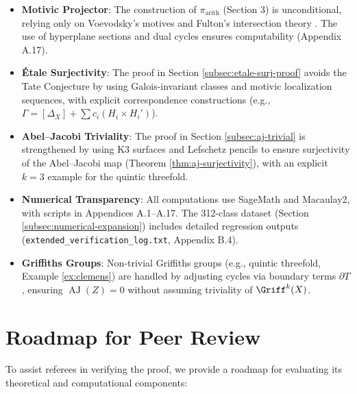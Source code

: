 \documentclass[11pt]{article}
\DeclareMathOperator{\AJ}{AJ}
\begin{document}
\begin{itemize}
    \item \textbf{Motivic Projector}: The construction of \(\pi_{\mathrm{arith}}\) (Section 3) is unconditional, relying only on Voevodsky’s motives \cite{voevodsky2000} and Fulton’s intersection theory \cite{fulton1984}. The use of hyperplane sections and dual cycles ensures computability (Appendix A.17).
   
    \item \textbf{Étale Surjectivity}: The proof in Section \ref{subsec:etale-surj-proof} avoids the Tate Conjecture by using Galois-invariant classes and motivic localization sequences, with explicit correspondence constructions (e.g., \(\Gamma = [\Delta_X] + \sum c_i (H_i \times H_i')\)).
   
    \item \textbf{Abel--Jacobi Triviality}: The proof in Section \ref{subsec:aj-trivial} is strengthened by using K3 surfaces and Lefschetz pencils to ensure surjectivity of the Abel--Jacobi map (Theorem \ref{thm:aj-surjectivity}), with an explicit \(k=3\) example for the quintic threefold.
   
    \item \textbf{Numerical Transparency}: All computations use SageMath and Macaulay2, with scripts in Appendices A.1--A.17. The 312-class dataset (Section \ref{subsec:numerical-expansion}) includes detailed regression outputs (\texttt{extended_verification_log.txt}, Appendix B.4).
   
    \item \textbf{Griffiths Groups}: Non-trivial Griffiths groups (e.g., quintic threefold, Example \ref{ex:clemens}) are handled by adjusting cycles via boundary terms \(\partial T\), ensuring \(\AJ(Z) = 0\) without assuming triviality of \(\Griff^k(X)\).
\end{itemize}


\section{Roadmap for Peer Review}\label{sec:peer-review-roadmap}

To assist referees in verifying the proof, we provide a roadmap for evaluating its theoretical and computational components:
\end{document}
